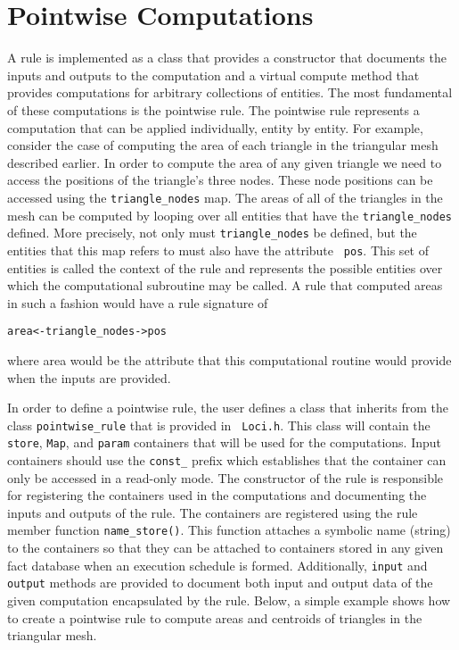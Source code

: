 \documentclass[10pt,epsf]{book}
\begin{document}
\section{Pointwise Computations}

A rule is implemented as a class that provides a constructor that
documents the inputs and outputs to the computation and a virtual
compute method that provides computations for arbitrary collections of
entities.  The most fundamental of these computations is the pointwise
rule.  The pointwise rule represents a computation that can be applied
individually, entity by entity.  For example, consider the case of
computing the area of each triangle in the triangular mesh described
earlier.  In order to compute the area of any given triangle we need
to access the positions of the triangle's three nodes.  These node
positions can be accessed using the {\tt triangle\_nodes} map.  The
areas of all of the triangles in the mesh can be computed by looping
over all entities that have the {\tt triangle\_nodes} defined.  More
precisely, not only must {\tt triangle\_nodes} be defined, but the
entities that this map refers to must also have the attribute {\tt
  pos}.  This set of entities is called the context of the rule and
represents the possible entities over which the computational
subroutine may be called.  A rule that computed areas in such a
fashion would have a rule signature of
\begin{verbatim}
area<-triangle_nodes->pos
\end{verbatim}
where area would be the attribute that this computational routine
would provide when the inputs are provided.  

In order to define a pointwise rule, the user defines a class that
inherits from the class {\tt pointwise\_rule} that is provided in {\tt
  Loci.h}.  This class will contain the {\tt store}, {\tt Map}, and
{\tt param} containers that will be used for the computations.  Input
containers should use the {\tt const\_} prefix which establishes that
the container can only be accessed in a read-only mode.  The
constructor of the rule is responsible for registering the containers
used in the computations and documenting the inputs and outputs of the
rule.  The containers are registered using the rule member function
{\tt name\_store()}.  This function attaches a symbolic name (string)
to the containers so that they can be attached to containers stored in
any given fact database when an execution schedule is formed.
Additionally, {\tt input} and {\tt output} methods are provided to
document both input and output data of the given computation
encapsulated by the rule.  Below, a simple example shows how to create
a pointwise rule to compute areas and centroids of triangles in the
triangular mesh.
\end{document}
